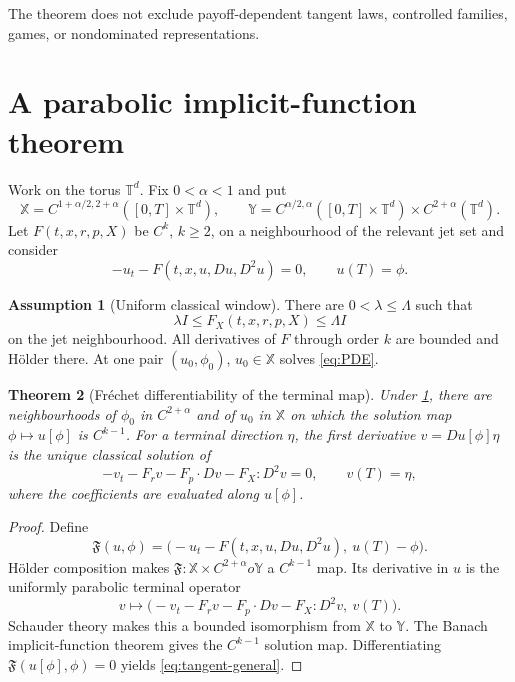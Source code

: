 \documentclass[11pt,reqno]{amsart}
\newtheorem{theorem}{Theorem}[section]
\theoremstyle{definition}
\newtheorem{assumption}[theorem]{Assumption}
\theoremstyle{remark}
\newcommand{\T}{\mathbb T}
\begin{document}
The theorem does not exclude payoff-dependent tangent laws, controlled
families, games, or nondominated representations.

\section{A parabolic implicit-function theorem}

Work on the torus $\T^d$.  Fix $0<\alpha<1$ and put
\[
 \mathbb X=C^{1+\alpha/2,2+\alpha}([0,T]\times\T^d),
 \qquad
 \mathbb Y=C^{\alpha/2,\alpha}([0,T]\times\T^d)
 \times C^{2+\alpha}(\T^d).
\]
Let $F(t,x,r,p,X)$ be $C^k$, $k\ge2$, on a neighbourhood of the relevant jet
set and consider
\begin{equation}\label{eq:PDE}
 -u_t-F(t,x,u,Du,D^2u)=0,
 \qquad u(T)=\phi.
\end{equation}

\begin{assumption}[Uniform classical window]\label{ass:window}
There are $0<\lambda\le\Lambda$ such that
\[
 \lambda I\le F_X(t,x,r,p,X)\le\Lambda I
\]
on the jet neighbourhood.  All derivatives of $F$ through order $k$ are
bounded and H\"older there.  At one pair $(u_0,\phi_0)$,
$u_0\in\mathbb X$ solves \eqref{eq:PDE}.
\end{assumption}

\begin{theorem}[Fr\'echet differentiability of the terminal map]\label{thm:IFT}
Under \cref{ass:window}, there are neighbourhoods of $\phi_0$ in
$C^{2+\alpha}$ and of $u_0$ in $\mathbb X$ on which the solution map
$\phi\mapsto u[\phi]$ is $C^{k-1}$.  For a terminal direction $\eta$, the first
derivative $v=Du[\phi]\eta$ is the unique classical solution of
\begin{equation}\label{eq:tangent-general}
 -v_t-F_rv-F_p\cdot Dv-F_X:D^2v=0,
 \qquad v(T)=\eta,
\end{equation}
where the coefficients are evaluated along $u[\phi]$.
\end{theorem}

\begin{proof}
Define
\[
 \mathfrak F(u,\phi)=
 \bigl(-u_t-F(t,x,u,Du,D^2u),\ u(T)-\phi\bigr).
\]
H\"older composition makes $\mathfrak F:\mathbb X\times C^{2+\alpha}	o
\mathbb Y$ a $C^{k-1}$ map.  Its derivative in $u$ is the uniformly parabolic
terminal operator
\[
 v\mapsto
 \bigl(-v_t-F_rv-F_p\cdot Dv-F_X:D^2v,\ v(T)\bigr).
\]
Schauder theory makes this a bounded isomorphism from $\mathbb X$ to
$\mathbb Y$.  The Banach implicit-function theorem gives the $C^{k-1}$
solution map.  Differentiating
$\mathfrak F(u[\phi],\phi)=0$ yields \eqref{eq:tangent-general}.
\end{proof}
\end{document}
